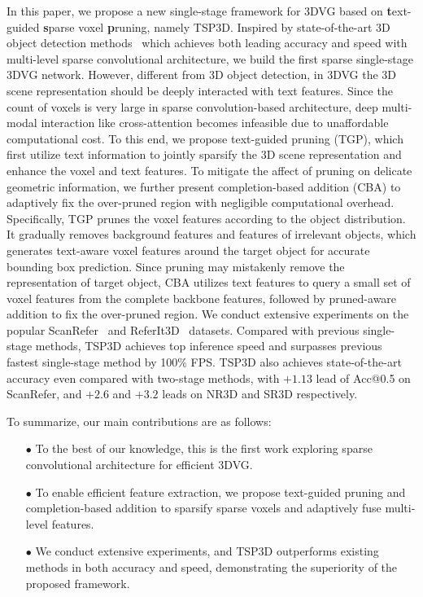 In this paper, we propose a new single-stage framework for 3DVG based on \textbf{t}ext-guided \textbf{s}parse voxel \textbf{p}runing, namely TSP3D. Inspired by state-of-the-art 3D object detection methods~\citep{rukhovich2022fcaf3d,xu2023dsp} which achieves both leading accuracy and speed with multi-level sparse convolutional architecture, we build the first sparse single-stage 3DVG network. However, different from 3D object detection, in 3DVG the 3D scene representation should be deeply interacted with text features. Since the count of voxels is very large in sparse convolution-based architecture, deep multi-modal interaction like cross-attention becomes infeasible due to unaffordable computational cost. To this end, we propose text-guided pruning (TGP), which first utilize text information to jointly sparsify the 3D scene representation and enhance the voxel and text features. To mitigate the affect of pruning on delicate geometric information, we further present completion-based addition (CBA) to adaptively fix the over-pruned region with negligible computational overhead.
Specifically, TGP prunes the voxel features according to the object distribution. It gradually removes background features and features of irrelevant objects, which generates text-aware voxel features around the target object for accurate bounding box prediction. Since pruning may mistakenly remove the representation of target object, CBA utilizes text features to query a small set of voxel features from the complete backbone features, followed by pruned-aware addition to fix the over-pruned region.
We conduct extensive experiments on the popular ScanRefer~\citep{chen2020scanrefer} and ReferIt3D~\citep{achlioptas2020referit3d} datasets.
Compared with previous single-stage methods, TSP3D achieves top inference speed and surpasses previous fastest single-stage method by 100\% FPS. TSP3D also achieves state-of-the-art accuracy even compared with two-stage methods, with $+1.13$ lead of Acc@0.5 on ScanRefer, and $+2.6$ and $+3.2$ leads on NR3D and SR3D respectively.

To summarize, our main contributions are as follows:
\begin{itemize}
	\item[$\bullet$] To the best of our knowledge, this is the first work exploring sparse convolutional architecture for efficient 3DVG.
	\item[$\bullet$] To enable efficient feature extraction, we propose text-guided pruning and completion-based addition to sparsify sparse voxels and adaptively fuse multi-level features.
	\item[$\bullet$] We conduct extensive experiments, and TSP3D outperforms existing methods in both accuracy and speed, demonstrating the superiority of the proposed framework.
\end{itemize}